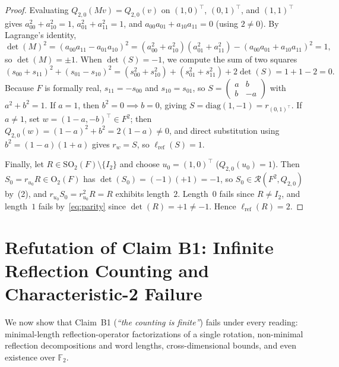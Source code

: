 \documentclass[11pt,a4paper]{article}
\theoremstyle{plain}
\theoremstyle{definition}
\newcommand{\F}{\mathbb{F}}
\newcommand{\Orth}{\mathrm{O}}
\newcommand{\SO}{\mathrm{SO}}
\newcommand{\Refl}{\mathcal{R}}
\newcommand{\lref}{\ell_{\mathrm{ref}}}
\begin{document}
\begin{proof}
Evaluating $Q_{2,0}(M v) = Q_{2,0}(v)$ on $(1, 0)^\top$, $(0, 1)^\top$, and $(1, 1)^\top$ gives $a_{00}^2 + a_{10}^2 = 1$, $a_{01}^2 + a_{11}^2 = 1$, and $a_{00} a_{01} + a_{10} a_{11} = 0$ (using $2 \neq 0$). By Lagrange's identity,
\[
  \det(M)^2 = (a_{00} a_{11} - a_{01} a_{10})^2 = (a_{00}^2 + a_{10}^2)(a_{01}^2 + a_{11}^2) - (a_{00} a_{01} + a_{10} a_{11})^2 = 1,
\]
so $\det(M) = \pm 1$. When $\det(S) = -1$, we compute the sum of two squares
\[
  (s_{00} + s_{11})^2 + (s_{01} - s_{10})^2 = (s_{00}^2 + s_{10}^2) + (s_{01}^2 + s_{11}^2) + 2\det(S) = 1 + 1 - 2 = 0.
\]
Because $F$ is formally real, $s_{11} = -s_{00}$ and $s_{10} = s_{01}$, so $S = \begin{pmatrix}a & b\\ b & -a\end{pmatrix}$ with $a^2 + b^2 = 1$. If $a = 1$, then $b^2 = 0 \implies b = 0$, giving $S = \mathrm{diag}(1, -1) = r_{(0, 1)^\top}$. If $a \neq 1$, set $w = (1 - a, -b)^\top \in F^2$; then $Q_{2,0}(w) = (1 - a)^2 + b^2 = 2(1 - a) \neq 0$, and direct substitution using $b^2 = (1 - a)(1 + a)$ gives $r_w = S$, so $\lref(S) = 1$.

Finally, let $R \in \SO_2(F) \setminus \{I_2\}$ and choose $u_0 = (1, 0)^\top$ ($Q_{2,0}(u_0) = 1$). Then $S_0 = r_{u_0} R \in \Orth_2(F)$ has $\det(S_0) = (-1)(+1) = -1$, so $S_0 \in \Refl(F^2, Q_{2,0})$ by~(2), and $r_{u_0} S_0 = r_{u_0}^2 R = R$ exhibits length~$2$. Length~$0$ fails since $R \neq I_2$, and length~$1$ fails by~\eqref{eq:parity} since $\det(R) = +1 \neq -1$. Hence $\lref(R) = 2$.
\end{proof}

\section{Refutation of Claim B1: Infinite Reflection Counting and Characteristic-2 Failure}

We now show that Claim~B1 (\emph{``the counting is finite''}) fails under every reading: minimal-length reflection-operator factorizations of a single rotation, non-minimal reflection decompositions and word lengths, cross-dimensional bounds, and even existence over $\F_2$.
\end{document}
